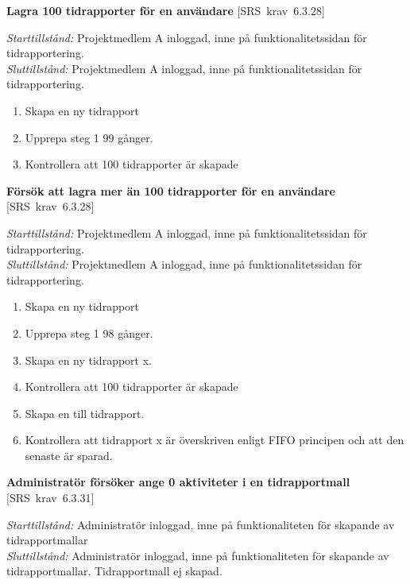 \documentclass[a4paper]{article}
\def\reqinside{\hfil\penalty 100 \hfilneg \hbox}
\def \req [#1]{\reqinside{[SRS krav #1]}}
\begin{document}
\begin{FT}

\item
\textbf{Lagra 100 tidrapporter för en användare} \req[6.3.28]

\emph{Starttillstånd:} Projektmedlem A inloggad, inne på funktionalitetssidan för tidrapportering.\\
\emph{Sluttillstånd:} Projektmedlem A inloggad, inne på funktionalitetssidan för tidrapportering.

\begin{enumerate}
\item Skapa en ny tidrapport
\item Upprepa steg 1 99 gånger.
\item Kontrollera att 100 tidrapporter är skapade
\end{enumerate}

\item
\textbf{Försök att lagra mer än 100 tidrapporter för en användare} \req[6.3.28]

\emph{Starttillstånd:} Projektmedlem A inloggad, inne på funktionalitetssidan för tidrapportering.\\
\emph{Sluttillstånd:} Projektmedlem A inloggad, inne på funktionalitetssidan för tidrapportering.

\begin{enumerate}
\item Skapa en ny tidrapport
\item Upprepa steg 1 98 gånger.
\item Skapa en ny tidrapport x.
\item Kontrollera att 100 tidrapporter är skapade
\item Skapa en till tidrapport. 
\item Kontrollera att tidrapport x är överskriven enligt FIFO principen och att den senaste är sparad.
\end{enumerate}




\item
\textbf{Administratör försöker ange 0 aktiviteter i en tidrapportmall} \req[6.3.31]

\emph{Starttillstånd:} Administratör inloggad, inne på funktionaliteten för skapande av tidrapportmallar\\
\emph{Sluttillstånd:} Administratör inloggad, inne på funktionaliteten för skapande av tidrapportmallar. Tidrapportmall ej skapad.\\


\end{FT}
\end{document}
